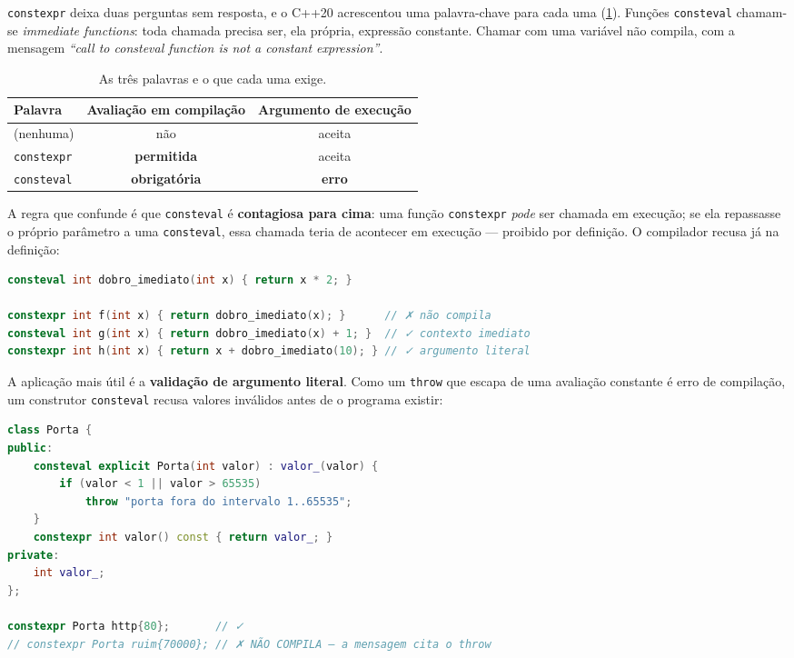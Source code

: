 \texttt{constexpr} deixa duas perguntas sem resposta, e o C++20 acrescentou uma
palavra-chave para cada uma (\cref{tab:tres-palavras}). Funções
\texttt{consteval} chamam-se \emph{immediate functions}: toda chamada precisa
ser, ela própria, expressão constante. Chamar com uma variável não compila, com
a mensagem \emph{``call to consteval function is not a constant expression''}.

\begin{table}[htbp]
\centering
\caption{As três palavras e o que cada uma exige.}
\label{tab:tres-palavras}
\footnotesize
\begin{tabular}{@{}lcc@{}}
\toprule
\textbf{Palavra} & \textbf{Avaliação em compilação} & \textbf{Argumento de execução} \\
\midrule
(nenhuma)          & não                  & aceita \\
\texttt{constexpr} & \textbf{permitida}   & aceita \\
\texttt{consteval} & \textbf{obrigatória} & \textbf{erro} \\
\bottomrule
\end{tabular}
\end{table}

A regra que confunde é que \texttt{consteval} é \textbf{contagiosa para cima}:
uma função \texttt{constexpr} \emph{pode} ser chamada em execução; se ela
repassasse o próprio parâmetro a uma \texttt{consteval}, essa chamada teria de
acontecer em execução --- proibido por definição. O compilador recusa já na
definição:

\begin{lstlisting}[style=bt, language=C++,
    caption={Quem repassa um parâmetro para uma \texttt{consteval} precisa ser
             \texttt{consteval}.}]
consteval int dobro_imediato(int x) { return x * 2; }

constexpr int f(int x) { return dobro_imediato(x); }      // ✗ não compila
consteval int g(int x) { return dobro_imediato(x) + 1; }  // ✓ contexto imediato
constexpr int h(int x) { return x + dobro_imediato(10); } // ✓ argumento literal
\end{lstlisting}

A aplicação mais útil é a \textbf{validação de argumento literal}. Como um
\texttt{throw} que escapa de uma avaliação constante é erro de compilação, um
construtor \texttt{consteval} recusa valores inválidos antes de o programa
existir:

\begin{lstlisting}[style=bt, language=C++,
    caption={Validação em compilação, em
             \texttt{src/compile\_time/demo\_consteval.hpp}.}]
class Porta {
public:
    consteval explicit Porta(int valor) : valor_(valor) {
        if (valor < 1 || valor > 65535)
            throw "porta fora do intervalo 1..65535";
    }
    constexpr int valor() const { return valor_; }
private:
    int valor_;
};

constexpr Porta http{80};       // ✓
// constexpr Porta ruim{70000}; // ✗ NÃO COMPILA — a mensagem cita o throw
\end{lstlisting}

